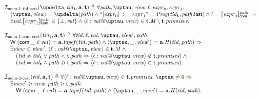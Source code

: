\[\begin{array}{l}
\invMemZeroCERT(\delta, \tId_{\tT}, \aT, \tT) \triangleq
      \forall \cpath, \tau, \R, \loc, \expr_0, \expr_1. \\
\quad \angled{\tau, \R} = \delta(\cpath) \land
      ``\writeInst{\expr_0}{\expr_1}" = \Cfarm(\tId_{\tT}, \lastInstr{\cpath}) \land \loc = \semfcom{\expr_0}{\cpath} \Rightarrow \\
\quad \exists \stval. \semfcom{\expr_1}{\cpath} \in \{\bot, \stval\} \land
      \writeEvt{\loc}{\stval}{\tau}{\R} \in \tT.\Mprom \setminus \tT.\PromSet. \\
\\
\invMemOneCERT(\tId_{\tT}, \aT, \tT) \triangleq \forall \tId, \loc, \stval, \tau, \R', \cpath. \\
  \quad \tapeWrite{(\tapeWriteCommitted{\_}{\loc}{\stval})} = \aT.\tapef(\tId, \cpath) \land
        \angled{\tau, \_, \R'} = \aT.\hmap(\tId, \cpath) \Rightarrow \\
  \quad \exists \R \le \R'. \; \writeEvt{\loc}{\stval}{\tau}{\R} \in \tT.\Mprom \land {} \\
  \quad \quad (\tId \not = \tId_{\tT} \lor \cpath <   \tT.\cpath \Rightarrow
               \writeEvt{\loc}{\stval}{\tau}{\R} \not \in \tT.\PromSet) \land {} \\
  \quad \quad (\tId = \tId_{\tT} \land \cpath \ge \tT.\cpath \Rightarrow
               \writeEvt{\loc}{\stval}{\tau}{\R} \in \tT.\PromSet).\\
\\
\invMemTwoCERT(\tId, \aT, \tT) \triangleq \forall \writeEvt{\loc}{\stval}{\tau}{\R} \in \tT.\PromSet. \;
     \tau \not = \tstamp{0} \Rightarrow \\
  \quad \exists \R' \ge \R, \cpath \ge \tT.\cpath . \\
  \quad \quad \tapeWrite{(\tapeWriteCommitted{\_}{\loc}{\stval})} = \aT.\tapef(\tId, \cpath) \land
              \angled{\tau, \_, \R'} = \aT.\hmap(\tId, \cpath). \\
\end{array}\]

